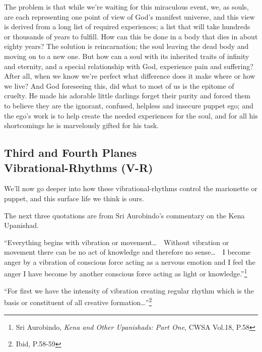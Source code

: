 \documentclass[12pt,a4paper]{book}
\begin{document}
The problem is that while we're waiting for this miraculous event, we,
as souls, are each representing one point of view of God's manifest
universe, and this view is derived from a long list of required
experiences; a list that will take hundreds or thousands of years to
fulfill. How can this be done in a body that dies in about eighty
years? The solution is reincarnation; the soul leaving the dead body
and moving on to a new one. But how can a soul with its inherited
traits of infinity and eternity, and a special relationship with God,
experience pain and suffering? After all, when we know we're perfect
what difference does it make where or how we live? And God foreseeing
this, did what to most of us is the epitome of cruelty. He made his
adorable little darlings forget their purity and forced them to
believe they are the ignorant, confused, helpless and insecure puppet
ego; and the ego's work is to help create the needed experiences for
the soul, and for all his shortcomings he is marvelously gifted for
his task.


\newpage
\begin{center}\section*{Third and Fourth Planes\\Vibrational-Rhythms (V-R)}\end{center}

We'll now go deeper into how these vibrational-rhythms control the
marionette or puppet, and this surface life we think is ours.

The next three quotations are from Sri Aurobindo's commentary on the
Kena Upanishad.

``Everything begins with vibration or movement\ldots\ \ Without
vibration or movement there can be no act of knowledge and therefore
no sense\ldots\ \ I become anger by a vibration of conscious force
acting as a nervous emotion and I feel the anger I have become by
another conscious force acting as light or knowledge.''\footnote{Sri
  Aurobindo, \emph{Kena and Other Upanishads: Part One}, CWSA Vol.18, P.58}


``For first we have the intensity of vibration creating regular rhythm
which is the basis or constituent of all creative
formation\ldots''\footnote{Ibid, P.58-59}
\end{document}
